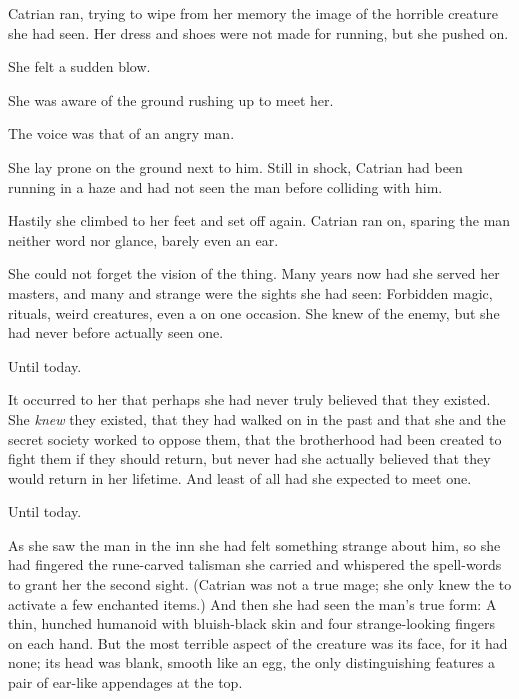 %

Catrian ran, trying to wipe from her memory the image of the horrible creature she had seen. Her dress and shoes were not made for running, but she pushed on. 

She felt a sudden blow. 

She was aware of the ground rushing up to meet her. 

 The voice was that of an angry man. 

She lay prone on the ground next to him. Still in shock, Catrian had been running in a haze and had not seen the man before colliding with him. 

Hastily she climbed to her feet and set off again. 
Catrian ran on, sparing the man neither word nor glance, barely even an ear. 

She could not forget the vision of the thing. Many years now had she served her masters, and many and strange were the sights she had seen: Forbidden magic, rituals, weird creatures, even a \dragon{} on one occasion. She knew of the enemy, but she had never before actually seen one. 

Until today. 

It occurred to her that perhaps she had never truly believed that they existed. She \emph{knew} they existed, that they had walked on \Miith{} in the past and that she and the secret society worked to oppose them, that the brotherhood had been created to fight them if they should return, but never had she actually believed that they would return in her lifetime. And least of all had she expected to meet one. 

Until today. 

As she saw the man in the inn she had felt something strange about him, so she had fingered the rune-carved talisman she carried and whispered the spell-words to grant her the second sight. 
(Catrian was not a true mage; she only knew the  to activate a few enchanted items.) 
And then she had seen the man's true form: A thin, hunched humanoid with bluish-black skin and four strange-looking fingers on each hand. But the most terrible aspect of the creature was its face, for it had none; its head was blank, smooth like an egg, the only distinguishing features a pair of ear-like appendages at the top. 

